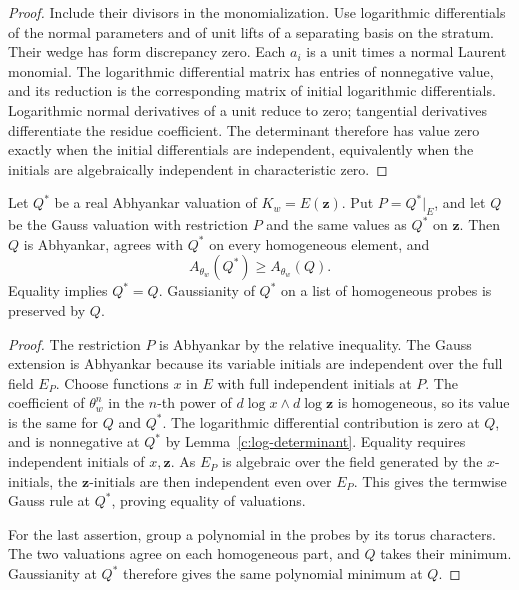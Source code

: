 \begin{proof}
Include their divisors in the monomialization.  Use logarithmic
differentials of the normal parameters and of unit lifts of a
separating basis on the stratum.  Their wedge has form discrepancy
zero.  Each \(a_i\) is a unit times a normal Laurent monomial.
The logarithmic differential matrix has entries of nonnegative
value, and its reduction is the corresponding matrix of initial
logarithmic differentials.  Logarithmic normal derivatives of a unit
reduce to zero; tangential derivatives differentiate the residue
coefficient.  The determinant therefore has value zero exactly
when the initial differentials are independent, equivalently when
the initials are algebraically independent in characteristic zero.
\end{proof}

\begin{lemma}[Invariantization]\label{c:invariantization}
Let \(Q^*\) be a real Abhyankar valuation of \(K_w=E(\mathbf z)\).
Put \(P=Q^*|_E\), and let \(Q\) be the Gauss valuation with restriction
\(P\) and the same values as \(Q^*\) on \(\mathbf z\).  Then \(Q\)
is Abhyankar, agrees with \(Q^*\) on every homogeneous element, and
\begin{equation}\label{eq:E1}
                    A_{\theta_w}(Q^*)\ge A_{\theta_w}(Q).
\end{equation}
Equality implies \(Q^*=Q\).  Gaussianity of \(Q^*\) on a list of
homogeneous probes is preserved by \(Q\).
\end{lemma}

\begin{proof}
The restriction \(P\) is Abhyankar by the relative inequality.
The Gauss extension is Abhyankar because its variable initials
are independent over the full field \(E_P\).  Choose functions
\(x\) in \(E\) with full independent initials at \(P\).
The coefficient of \(\theta_w^n\) in the \(n\)-th power of
\(d\log x\wedge d\log\mathbf z\) is homogeneous, so its value is
the same for \(Q\) and \(Q^*\).  The logarithmic differential
contribution is zero at \(Q\), and is nonnegative at \(Q^*\) by
Lemma~\ref{c:log-determinant}.  Equality requires independent
initials of \(x,\mathbf z\).  As \(E_P\) is algebraic over the
field generated by the \(x\)-initials, the \(\mathbf z\)-initials
are then independent even over \(E_P\).  This gives the termwise
Gauss rule at \(Q^*\), proving equality of valuations.

For the last assertion, group a polynomial in the probes by its
torus characters.  The two valuations agree on each homogeneous
part, and \(Q\) takes their minimum.  Gaussianity at \(Q^*\)
therefore gives the same polynomial minimum at \(Q\).
\end{proof}

